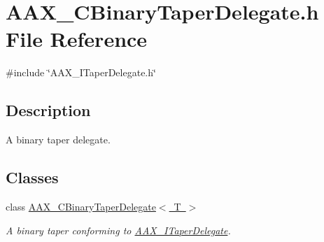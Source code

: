 \hypertarget{a00413}{}\section{A\+A\+X\+\_\+\+C\+Binary\+Taper\+Delegate.\+h File Reference}
\label{a00413}
{\ttfamily \#include \char`\"{}A\+A\+X\+\_\+\+I\+Taper\+Delegate.\+h\char`\"{}}\newline


\subsection{Description}
A binary taper delegate. 

\subsection*{Classes}
\begin{DoxyCompactItemize}
\item 
class \mbox{\hyperlink{a01457}{A\+A\+X\+\_\+\+C\+Binary\+Taper\+Delegate$<$ T $>$}}
\begin{DoxyCompactList}\small\item\em A binary taper conforming to \mbox{\hyperlink{a01881}{A\+A\+X\+\_\+\+I\+Taper\+Delegate}}. \end{DoxyCompactList}\end{DoxyCompactItemize}
